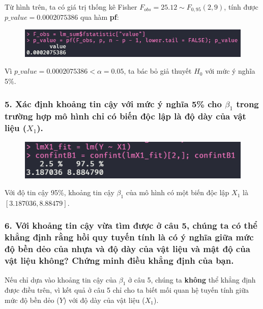 \documentclass[a4paper]{article}
\theoremstyle{nonumberplain}
\begin{document}
Từ hình trên, ta có giá trị thống kê Fisher $F_{obs} = 25.12 \sim F_{0,95}(2,9)$, tính được $p\_value = 0.0002075386$ qua hàm \textbf{pf}:
\begin{figure}[h!]
	\centering
	\includegraphics[width=0.7\linewidth]{bai-2-4-p_value}
	\label{fig:bai-2-4-pvalue}
\end{figure}

Vì $p\_value = 0.0002075386 < \alpha = 0.05$, ta bác bỏ giả thuyết $H_0$ với mức ý nghĩa 5\%.

\subsubsection*{5. Xác định khoảng tin cậy với mức ý nghĩa 5\% cho $\beta_1$ trong trường hợp mô hình chỉ có biến độc lập là độ dày của vật liệu ($X_1$).}

\begin{figure}[h!]
	\centering
	\includegraphics[width=0.7\linewidth]{bai-2-5-confint-beta1}
	\label{fig:bai-2-5-confint-beta1}
\end{figure}

Với độ tin cậy 95\%, khoảng tin cậy $\beta_1$ của mô hình có một biến độc lập $X_1$ là $[3.187036,8.88479]$.

\subsubsection*{6. Với khoảng tin cậy vừa tìm được ở câu 5, chúng ta có thể khẳng định rằng hồi quy tuyến tính là có ý nghĩa giữa mức độ bền dẻo của nhựa và độ dày của vật liệu và mật độ của vật liệu không? Chứng minh điều khẳng định của bạn.}

Nếu chỉ dựa vào khoảng tin cậy của $\beta_1$ ở câu 5, chúng ta \textbf{không} thể khẳng định được điều trên, vì kết quả ở câu 5 chỉ cho ta biết mối quan hệ tuyến tính giữa mức độ bền dẻo ($Y$) với độ dày của vật liệu ($X_1$).
\end{document}
